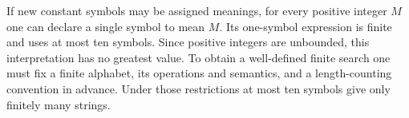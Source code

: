 If new constant symbols may be assigned meanings, for every positive integer $ M $ one can declare a single symbol to mean $ M $. Its one-symbol expression is finite and uses at most ten symbols. Since positive integers are unbounded, this interpretation has no greatest value. To obtain a well-defined finite search one must fix a finite alphabet, its operations and semantics, and a length-counting convention in advance. Under those restrictions at most ten symbols give only finitely many strings.
